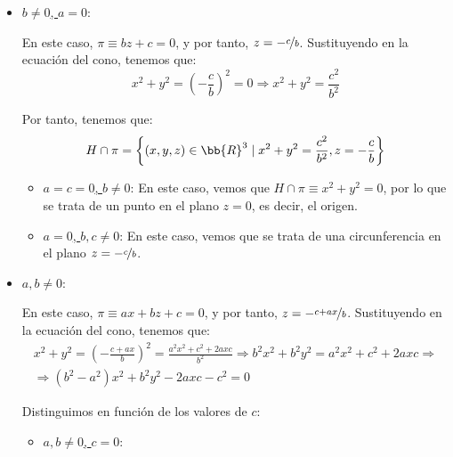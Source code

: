 \documentclass[12pt]{article}
\begin{document}
\begin{ejercicio}[3 puntos]
\begin{itemize}
            \item \ul{$b\neq 0$, $a=0$}:
            
            En este caso, $\pi\equiv bz+c=0$, y por tanto, $z=-\nicefrac{c}{b}$.
            Sustituyendo en la ecuación del cono, tenemos que:
            \begin{equation*}
                x^2+y^2=\left(-\frac{c}{b}\right)^2 = 0
                \Longrightarrow
                x^2+y^2 = \frac{c^2}{b^2}
            \end{equation*}

            Por tanto, tenemos que:
            \begin{equation*}
                H\cap \pi = \left\{(x,y,z)\in \bb{R}^3\mid x^2+y^2=\frac{c^2}{b^2}, z=-\frac{c}{b}\right\}
            \end{equation*}

            \begin{itemize}
                \item \ul{$a=c=0$, $b\neq 0$}:
                En este caso, vemos que $H\cap \pi\equiv x^2+y^2=0$, por lo que
                se trata de un punto en el plano $z=0$, es decir, el origen.

                \item \ul{$a=0$, $b,c\neq 0$}:
                En este caso, vemos que se trata de una circunferencia en el plano
                $z=-\nicefrac{c}{b}$.
            \end{itemize}

            \item \ul{$a,b\neq 0$}:
            
            En este caso, $\pi\equiv ax+bz+c=0$, y por tanto, $z=-\nicefrac{c+ax}{b}$.
            Sustituyendo en la ecuación del cono, tenemos que:
            \begin{multline*}
                x^2+y^2=\left(-\frac{c+ax}{b}\right)^2 = \frac{a^2x^2+c^2+2axc}{b^2}
                \Longrightarrow
                b^2x^2+b^2y^2=a^2x^2+c^2+2axc
                \Longrightarrow \\ \Longrightarrow
                 (b^2-a^2)x^2+b^2y^2-2axc-c^2=0
            \end{multline*}

            Distinguimos en función de los valores de $c$:
            \begin{itemize}
                \item \ul{$a,b\neq 0$, $c=0$}:
                

\end{itemize}
\end{itemize}
\end{ejercicio}
\end{document}

